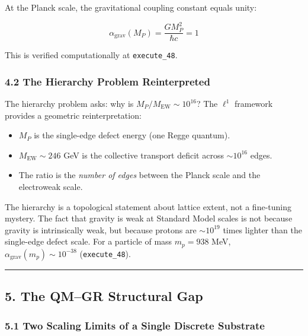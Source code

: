 \documentclass[
]{article}
\providecommand{\tightlist}{%
  \setlength{\itemsep}{0pt}\setlength{\parskip}{0pt}}
\begin{document}
At the Planck scale, the gravitational coupling constant equals unity:

\[\alpha_{\mathrm{grav}}(M_P) = \frac{G M_P^2}{\hbar c} = 1\]

This is verified computationally at \texttt{execute\_48}.

\hypertarget{the-hierarchy-problem-reinterpreted}{%
\subsubsection{4.2 The Hierarchy Problem
Reinterpreted}\label{the-hierarchy-problem-reinterpreted}}

The hierarchy problem asks: why is
\(M_P / M_{\mathrm{EW}} \sim 10^{16}\)? The \(\ell^1\) framework
provides a geometric reinterpretation:

\begin{itemize}
\tightlist
\item
  \(M_P\) is the single-edge defect energy (one Regge quantum).
\item
  \(M_{\mathrm{EW}} \sim 246\) GeV is the collective transport deficit
  across \(\sim 10^{16}\) edges.
\item
  The ratio is the \emph{number of edges} between the Planck scale and
  the electroweak scale.
\end{itemize}

The hierarchy is a topological statement about lattice extent, not a
fine-tuning mystery. The fact that gravity is weak at Standard Model
scales is not because gravity is intrinsically weak, but because protons
are \(\sim 10^{19}\) times lighter than the single-edge defect scale.
For a particle of mass \(m_p = 938\) MeV,
\(\alpha_{\mathrm{grav}}(m_p) \sim 10^{-38}\) (\texttt{execute\_48}).

\begin{center}\rule{0.5\linewidth}{0.5pt}\end{center}

\hypertarget{the-qmgr-structural-gap}{%
\subsection{5. The QM--GR Structural
Gap}\label{the-qmgr-structural-gap}}

\hypertarget{two-scaling-limits-of-a-single-discrete-substrate}{%
\subsubsection{5.1 Two Scaling Limits of a Single Discrete
Substrate}\label{two-scaling-limits-of-a-single-discrete-substrate}}
\end{document}
